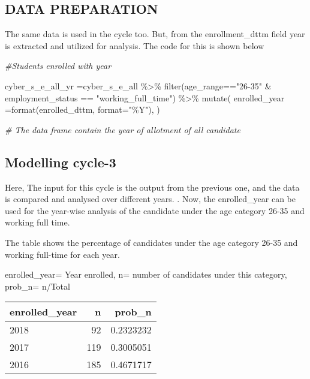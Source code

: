 \documentclass[
]{article}
\newenvironment{Shaded}{\begin{snugshade}}{\end{snugshade}}
\newcommand{\AttributeTok}[1]{\textcolor[rgb]{0.77,0.63,0.00}{#1}}
\newcommand{\CommentTok}[1]{\textcolor[rgb]{0.56,0.35,0.01}{\textit{#1}}}
\newcommand{\FunctionTok}[1]{\textcolor[rgb]{0.00,0.00,0.00}{#1}}
\newcommand{\NormalTok}[1]{#1}
\newcommand{\OtherTok}[1]{\textcolor[rgb]{0.56,0.35,0.01}{#1}}
\newcommand{\SpecialCharTok}[1]{\textcolor[rgb]{0.00,0.00,0.00}{#1}}
\newcommand{\StringTok}[1]{\textcolor[rgb]{0.31,0.60,0.02}{#1}}
\begin{document}
\hypertarget{data-preparation-3}{%
\subsection{DATA PREPARATION}\label{data-preparation-3}}

The same data is used in the cycle too. But, from the enrollment\_dttm
field year is extracted and utilized for analysis. The code for this is
shown below

\begin{Shaded}
\begin{Highlighting}[]
\CommentTok{\#Students enrolled  with year}

\NormalTok{cyber\_s\_e\_all\_yr }\OtherTok{=}\NormalTok{cyber\_s\_e\_all }\SpecialCharTok{\%\textgreater{}\%} \FunctionTok{filter}\NormalTok{(age\_range}\SpecialCharTok{==}\StringTok{"26{-}35"} \SpecialCharTok{\&}\NormalTok{ employment\_status }\SpecialCharTok{==} \StringTok{"working\_full\_time"}\NormalTok{) }\SpecialCharTok{\%\textgreater{}\%}
  \FunctionTok{mutate}\NormalTok{(}
    \AttributeTok{enrolled\_year =}\FunctionTok{format}\NormalTok{(enrolled\_dttm, }\AttributeTok{format=}\StringTok{"\%Y"}\NormalTok{),}
\NormalTok{  ) }

\CommentTok{\# The data frame contain the year of allotment of all candidate}
\end{Highlighting}
\end{Shaded}

\hypertarget{modelling-cycle-3}{%
\subsection{Modelling cycle-3}\label{modelling-cycle-3}}

Here, The input for this cycle is the output from the previous one, and
the data is compared and analysed over different years. . Now, the
enrolled\_year can be used for the year-wise analysis of the candidate
under the age category 26-35 and working full time.

The table shows the percentage of candidates under the age category
26-35 and working full-time for each year.

enrolled\_year= Year enrolled, n= number of candidates under this
category, prob\_n= n/Total

\begin{longtable}[]{@{}lrr@{}}
\toprule
enrolled\_year & n & prob\_n \\
\midrule
\endhead
2018 & 92 & 0.2323232 \\
2017 & 119 & 0.3005051 \\
2016 & 185 & 0.4671717 \\
\bottomrule
\end{longtable}
\end{document}
